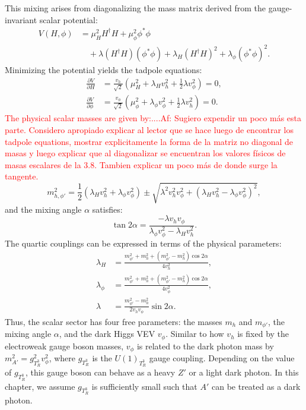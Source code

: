 This mixing arises from diagonalizing the mass matrix derived from the gauge-invariant scalar potential:
\begin{equation}
    \begin{aligned}
        V(H, \phi) &= \mu_H^2 H^\dagger H + \mu_\phi^2 \phi^* \phi \\
                    &\quad + \lambda (H^\dagger H)(\phi^* \phi) + \lambda_H (H^\dagger H)^2 + \lambda_\phi (\phi^* \phi)^2.
    \end{aligned}
\end{equation}
Minimizing the potential yields the tadpole equations:
\begin{align}
    \frac{\partial V}{\partial H} &= \frac{v_h}{\sqrt{2}} \left( \mu_H^2 + \lambda_H v_h^2 + \frac{1}{2} \lambda v_\phi^2 \right) = 0, \\
    \frac{\partial V}{\partial \phi} &= \frac{v_\phi}{\sqrt{2}} \left( \mu_\phi^2 + \lambda_\phi v_\phi^2 + \frac{1}{2} \lambda v_h^2 \right) = 0.
\end{align}
\textcolor{red}{The physical scalar masses are given by:....Af: Sugiero expendir un poco más esta parte. Considero apropiado explicar al lector que se hace luego de encontrar los tadpole equations, mostrar explicitamente la forma de la matriz no diagonal de masas y luego explicar que al diagonalizar se encuentran los valores físicos de masas escalares de la 3.8. Tambien explicar un poco más de donde surge la tangente.}
\begin{equation}
    m_{h,\phi'}^2 = \frac{1}{2} \left( \lambda_H v_h^2 + \lambda_\phi v_\phi^2 \right) \pm \sqrt{ \lambda^2 v_h^2 v_\phi^2 + \left( \lambda_H v_h^2 - \lambda_\phi v_\phi^2 \right)^2 },
\end{equation}
and the mixing angle $\alpha$ satisfies:
\begin{equation}
    \tan 2\alpha = \frac{-\lambda v_h v_\phi}{ \lambda_\phi v_\phi^2 - \lambda_H v_h^2}.
\end{equation}
The quartic couplings can be expressed in terms of the physical parameters:
\begin{align}
  \lambda_H &= \frac{m_{\phi'}^2 + m_h^2 + (m_{\phi'}^2 - m_h^2)\cos 2\alpha}{4 v_h^2}, \\
  \lambda_\phi &= \frac{m_{\phi'}^2 + m_h^2 + (m_{\phi'}^2 - m_h^2)\cos 2\alpha}{4 v_\phi^2}, \\
  \lambda &= \frac{m_{\phi'}^2 - m_h^2}{2 v_h v_\phi} \sin 2\alpha.
\end{align}
Thus, the scalar sector has four free parameters: the masses $m_h$ and $m_{\phi'}$, the mixing angle $\alpha$, and the dark Higgs VEV $v_\phi$. Similar to how $v_h$ is fixed by the electroweak gauge boson masses, $v_\phi$ is related to the dark photon mass by $m_{A'}^2 = g_{T^3_R}^2 v_\phi^2$, where $g_{T^3_R}$ is the $U(1)_{T^3_R}$ gauge coupling. Depending on the value of $g_{T^3_R}$, this gauge boson can behave as a heavy $Z'$ or a light dark photon. In this chapter, we assume $g_{T^3_R}$ is sufficiently small such that $A'$ can be treated as a dark photon.

